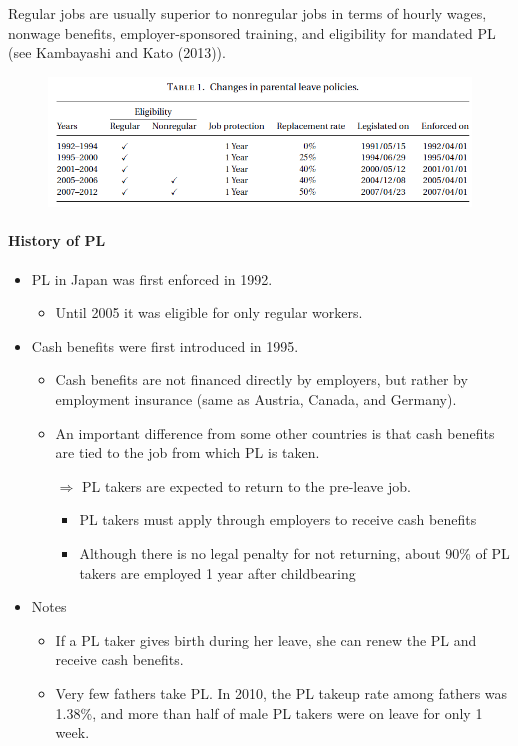 \documentclass[../root]{subfiles}
\begin{document}
    Regular jobs are usually superior to nonregular jobs in terms of hourly wages, nonwage benefits, employer-sponsored training, and eligibility for mandated PL (see Kambayashi and Kato (2013)).

    \begin{figure}[h]
      \centering
      \includegraphics[scale = 1]{0619tanji/T1}
      \label{T1}
    \end{figure}

    \paragraph{History of PL}

    \begin{itemize}
      \item PL in Japan was first enforced in 1992.
      \begin{itemize}
        \item Until 2005 it was eligible for only regular workers.
      \end{itemize}
      \item Cash benefits were first introduced in 1995.
      \begin{itemize}
        \item Cash benefits are not financed directly by employers, but rather by employment insurance (same as Austria, Canada, and Germany).
        \item An important difference from some other countries is that cash benefits are tied to the job from which PL is taken.

        $\Rightarrow$ PL takers are expected to return to the pre-leave job.
        \begin{itemize}
          \item PL takers must apply through employers to receive cash benefits
          \item Although there is no legal penalty for not returning, about 90\% of PL takers are employed 1 year after childbearing
        \end{itemize}
      \end{itemize}
      \item Notes
      \begin{itemize}
        \item If a PL taker gives birth during her leave, she can renew the PL and receive cash benefits.
        \item Very few fathers take PL. In 2010, the PL takeup rate among fathers was 1.38\%, and more than half of male PL takers were on leave for only 1 week.
      \end{itemize}
    \end{itemize}
\end{document}
